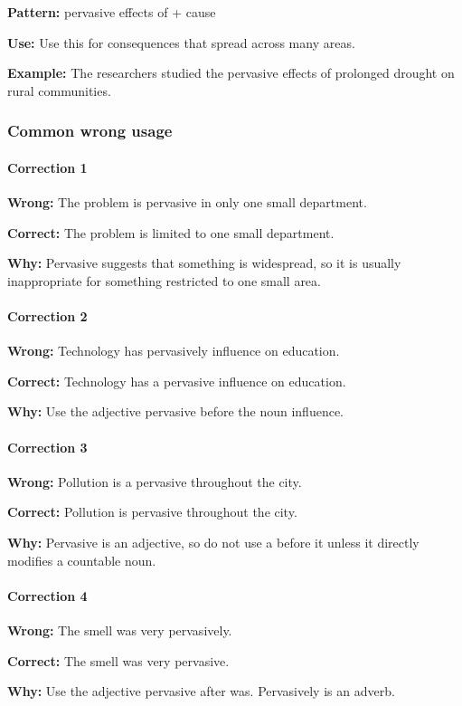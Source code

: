\documentclass[11pt]{article}
\begin{document}
\textbf{Pattern:} pervasive effects of + cause

\textbf{Use:} Use this for consequences that spread across many areas.

\textbf{Example:} The researchers studied the pervasive effects of prolonged drought on rural communities.

\subsubsection{Common wrong usage}
\paragraph{Correction 1}
\textbf{Wrong:} The problem is pervasive in only one small department.

\textbf{Correct:} The problem is limited to one small department.

\textbf{Why:} Pervasive suggests that something is widespread, so it is usually inappropriate for something restricted to one small area.

\paragraph{Correction 2}
\textbf{Wrong:} Technology has pervasively influence on education.

\textbf{Correct:} Technology has a pervasive influence on education.

\textbf{Why:} Use the adjective pervasive before the noun influence.

\paragraph{Correction 3}
\textbf{Wrong:} Pollution is a pervasive throughout the city.

\textbf{Correct:} Pollution is pervasive throughout the city.

\textbf{Why:} Pervasive is an adjective, so do not use a before it unless it directly modifies a countable noun.

\paragraph{Correction 4}
\textbf{Wrong:} The smell was very pervasively.

\textbf{Correct:} The smell was very pervasive.

\textbf{Why:} Use the adjective pervasive after was. Pervasively is an adverb.
\end{document}
